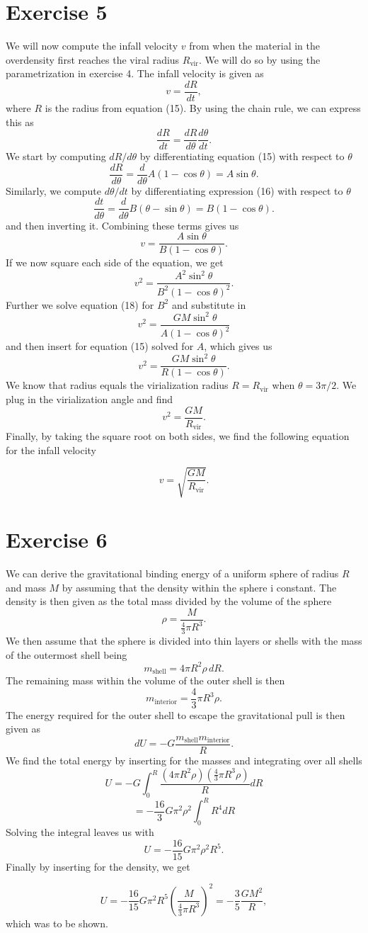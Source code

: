 \documentclass[a4paper]{article}
\begin{document}
\section*{Exercise 5}

We will now compute the infall velocity $v$ from when the material in the overdensity first reaches the viral radius $R_{\text{vir}}$. We will do so by using the parametrization in exercise 4. The infall velocity is given as
\[
    v = \frac{dR}{dt},
\]
where $R$ is the radius from equation (15). By using the chain rule, we can express this as 
\[
    \frac{dR}{dt} = \frac{dR}{d\theta} \frac{d \theta}{dt}.
\]
We start by computing $dR/d\theta$ by differentiating equation (15) with respect to $\theta$
\[
    \frac{dR}{d\theta} = \frac{d}{d\theta} A(1-\cos\theta) = A \sin \theta.
\]
Similarly, we compute $d\theta/dt$ by differentiating expression (16) with respect to $\theta$
\[
    \frac{dt}{d\theta} = \frac{d}{d\theta} B(\theta-\sin\theta) = B(1 - \cos \theta).
\]
and then inverting it. Combining these terms gives us
\[
    v = \frac{A \sin \theta}{B (1- \cos \theta)}.
\]
If we now square each side of the equation, we get
\[
v^2 = \frac{A^2 \sin^2 \theta}{B^2 (1-\cos \theta)^2}.
\]
Further we solve equation (18) for $B^2$ and substitute in
\[
v^2 = \frac{GM\sin^2 \theta}{A(1-\cos \theta)^2}
\]
and then insert for equation (15) solved for $A$, which gives us
\[
    v^2 = \frac{GM \sin^2 \theta}{R (1-\cos \theta)}.
\]
We know that radius equals the virialization radius $R=R_\text{vir}$ when $\theta = 3\pi / 2$. We plug in the virialization angle and find
\[
    v^2 = \frac{GM}{R_\text{vir}}.
\]
Finally, by taking the square root on both sides, we find the following equation for the infall velocity

\begin{equation}
    v = \sqrt{\frac{GM}{R_\text{vir}}}.
\end{equation}
\section*{Exercise 6}

We can derive the gravitational binding energy of a uniform sphere of radius $R$ and mass $M$ by assuming that the density within the sphere i constant. The density is then given as the total mass divided by the volume of the sphere
\[
\rho = \frac{M}{\frac{4}{3} \pi R^3}.
\]
We then assume that the sphere is divided into thin layers or shells with the mass of the outermost shell being
\[
m_{\text{shell}} = 4\pi R^2 \rho\, dR.
\]
The remaining mass within the volume of the outer shell is then
\[
m_{\text{interior}} = \frac{4}{3}\pi R^3 \rho.
\]
The energy required for the outer shell to escape the gravitational pull is then given as
\[
dU = -G\frac{m_{\text{shell}} m_{\text{interior}} }{R}.
\]
We find the total energy by inserting for the masses and integrating over all shells
\[
U = -G \int^R_0 \frac{\left(4\pi R^2 \rho\right)  \left(\frac{4}{3}\pi R^3 \rho \right)}{R} dR
\]
\[
= - \frac{16}{3} G\pi^2 \rho^2 \int_0^R R^4 dR
\]
Solving the integral leaves us with 
\[
U = - \frac{16}{15} G \pi^2 \rho^2 R^5.
\]
Finally by inserting for the density, we get

\[
U = - \frac{16}{15} G \pi^2 R^5 \left(\frac{M}{\frac{4}{3} \pi R^3}\right)^2 = - \frac{3}{5} \frac{GM^2}{R},
\]
which was to be shown.
\end{document}
